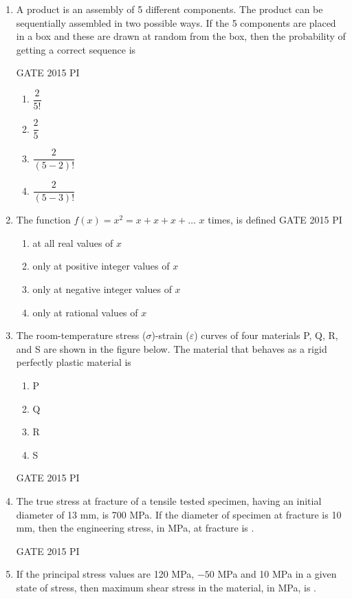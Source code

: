 \documentclass[journal,12pt,onecolumn]{IEEEtran}
\theoremstyle{remark}
\begin{document}
\begin{enumerate}
\item A product is an assembly of 5 different components. The product can be sequentially assembled in two possible ways. If the 5 components are placed in a box and these are drawn at random from the box, then the probability of getting a correct sequence is


\hfill{GATE 2015 PI}
\begin{enumerate}
    \item $\dfrac{2}{5!}$
    \item $\dfrac{2}{5}$
    \item $\dfrac{2}{(5-2)!}$
    \item $\dfrac{2}{(5-3)!}$
\end{enumerate}





\item The function $f(x) = x^2 = x + x + x + \ldots$ $x$ times, is defined
\hfill{GATE 2015 PI}

\begin{enumerate}
    \item at all real values of $x$
    \item only at positive integer values of $x$
    \item only at negative integer values of $x$
    \item only at rational values of $x$
\end{enumerate}
\item The room-temperature stress ($\sigma$)-strain ($\varepsilon$) curves of four materials P, Q, R, and S are shown in the figure below. The material that behaves as a rigid perfectly plastic material is

\begin{enumerate}
    \item P
    \item Q
    \item R
    \item S
\end{enumerate}

\hfill{GATE 2015 PI}

\item The true stress at fracture of a tensile tested specimen, having an initial diameter of 13 mm, is 700 MPa. If the diameter of specimen at fracture is 10 mm, then the engineering stress, in MPa, at fracture is \underline{\hspace{3cm}}.

\hfill{GATE 2015 PI}
\item If the principal stress values are 120 MPa, $-50$ MPa and 10 MPa in a given state of stress, then maximum shear stress in the material, in MPa, is \underline{\hspace{3cm}}.


\end{enumerate}
\end{document}
